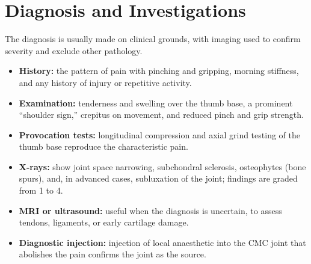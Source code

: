\section*{Diagnosis and Investigations}
The diagnosis is usually made on clinical grounds, with imaging used to confirm severity and exclude other pathology.
\begin{itemize}
    \item \textbf{History:} the pattern of pain with pinching and gripping, morning stiffness, and any history of injury or repetitive activity.
    \item \textbf{Examination:} tenderness and swelling over the thumb base, a prominent ``shoulder sign,'' crepitus on movement, and reduced pinch and grip strength.
    \item \textbf{Provocation tests:} longitudinal compression and axial grind testing of the thumb base reproduce the characteristic pain.
    \item \textbf{X-rays:} show joint space narrowing, subchondral sclerosis, osteophytes (bone spurs), and, in advanced cases, subluxation of the joint; findings are graded from 1 to 4.
    \item \textbf{MRI or ultrasound:} useful when the diagnosis is uncertain, to assess tendons, ligaments, or early cartilage damage.
    \item \textbf{Diagnostic injection:} injection of local anaesthetic into the CMC joint that abolishes the pain confirms the joint as the source.
\end{itemize}

